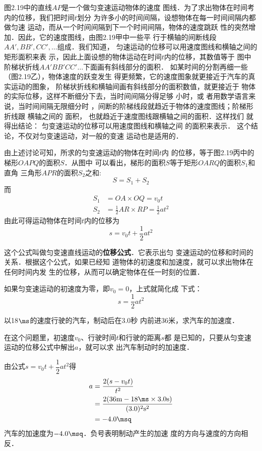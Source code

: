     图2.19中的直线$AP$是一个做匀变速运动物体的速度
图线．为了求出物体在时间考内的位移，我们把时间$t$划分
为许多小的时间间隔，设想物体在每一时间间隔内都做匀速
运动，而从一个时间间隔到下一个时间间隔，物体的速度跳跃
性的突然增加．因此，它的速度图线，由图2.19甲中一些平
行于横轴的间断线段$AA',BB',CC',\ldots$组成．我们知道，
匀速运动的位移可以用速度图线和横轴之间的矩形面积来表
示，因此上面设想的物体运动在时间$t$内的位移，其数值等于
图中阶梯状折线$AA'BB'CC'\ldots$下面画有斜线部分的面积．
如某时间的分割再细一些（图2.19乙），物体速度的跃变发生
得更频繁，它的速度图象就更接近于汽车的真实运动的图象，
阶梯状折线和横轴间画有斜线部分的面积数值，就更接近于
物体的实际位移，这样不断细分下去，当时间间隔分得足够
小时，或
者用数学语言来说，当时间间隔无限细分时
，间断的阶梯线段就趋近于物体的速度图线；阶梯形折线跟
横轴之间的
面积，
也就趋近于速度图线跟横轴之间的面积．这样找们
就得出结论：
匀变速运动的位移可以用速度图线和横轴之间
的面积来表示．
这个结论，不仅对匀变速运动，对一般的变速
运动也是适用的．

由上述讨论可知，所求的匀变速运动的物体在时间$t$内
的位移，等于图2.19丙中的梯形$OAPQ$的面积$S$．从图中
可以看出，梯形的面积$S$等于矩形$OARQ$的面积$S_1$和直角
三角形$APR$的面积$S_2$之和:
\[S=S_1+S_2\]
而
 \[\begin{split}
S_1&=OA\times OQ=v_0 t\\
S_2&=\frac{1}{2}AR\times RP=\frac{1}{2}at^2
\end{split}\]
由此可得运动物体在时间$t$内的位移为
\[s=v_0t+\frac{1}{2}at^2 \]

    这个公式叫做匀变速直线运动的\textbf{位移公式}．它表示出匀
变速运动的位移和时间的关系．根据这个公式，如果已经知
道物体的初速度和加速度，就可以求出物体在任何时间内发
生的位移，从而可以确定物体在任一时刻的位置．

    如果匀变速运动的初速度为零，即$v_0=0$，上式就简化成
下式：
\[s=\frac{1}{2}at^2  \]

\begin{example}
以18$\ms$的速度行驶的汽车，制动后在3.0秒
内前进36米，求汽车的加速度．
\end{example}

\begin{solution}
    在这个问题里，初速度$v_0$、行驶时间$t$和行驶的距离$s$都
是已知的，只要从匀变速运动的位移公式中解出$a$，就可以求
出汽车制动时的加速度．

由公式$s=v_0t+\dfrac{1}{2}at^2$得
\[\begin{split}
a&=\frac{2(s-v_0t)}{t^2}\\
&=\frac{2(36{\rm m}-18\ms\times 3.0{\rm s})}{(3.0)^2{\rm s}^2}\\
&=-4.0\msq
\end{split} \]
    汽车的加速度为$-4.0\msq$．负号表明制动产生的加速
度的方向与速度的方向相反．

\end{solution}

